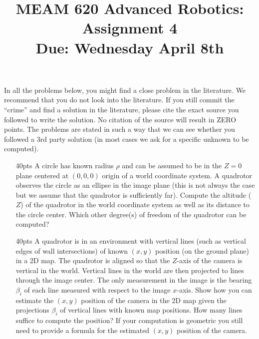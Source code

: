 \documentclass[11pt,english]{article}
\title{MEAM 620 Advanced Robotics: Assignment 4\\
Due:  Wednesday April 8th}
\author{}
\date{}
\begin{document}
\maketitle
In all the problems below, you might find a close problem in the literature. We recommend that you do not look into the literature. If you still commit the ``crime'' and find a solution in the literature, please cite the exact source you followed to write the solution. 
No citation of the source will result in ZERO points. The problems are stated in such a way that we can see whether you followed a 3rd party solution (in most cases we ask for a specific unknown to be computed).


\begin{enumerate}

\item [40pts]
 A circle has known radius $\rho$ and can be assumed to be in the $Z=0$ plane centered at $(0,0,0)$ origin of a world coordinate system. A quadrotor observes the circle as an ellipse in the image plane (this is not always the case but we assume that the quadrotor is sufficiently far). Compute the altitude ($Z$) of the quadrotor in the world coordinate system as well as its distance to the circle center. 
Which other degree(s) of freedom of the quadrotor can be computed?

\item[40pts]
A quadrotor is in an environment with vertical lines (such as vertical edges of wall intersections) of known $(x,y)$ position (on the ground plane) in a 2D map.  The quadrotor is aligned so that the $Z$-axis of the camera is vertical in the world. Vertical lines in the world are then projected to lines through the image center. The only measurement in the image is the bearing $\beta_i$ of each line measured with respect to the image $x$-axis. Show how you can estimate the $(x,y)$ position of the camera in the 2D map given the projections $\beta_i$ of vertical lines with known map positions. How many lines suffice to compute the position? If your computation is geometric you still need to provide a formula for the estimated $(x,y)$ position of the camera. 



\end{enumerate}
\end{document}
